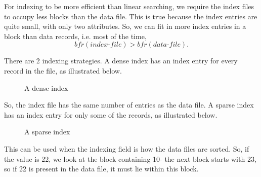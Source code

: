 \documentclass[a4paper, openany]{memoir}
\begin{document}
For indexing to be more efficient than linear searching, we require the index files to occupy less blocks than the data file. This is true because the index entries are quite small, with only two attributes. So, we can fit in more index entries in a block than data records, i.e. most of the time,
\[\textit{bfr}(\textit{index-file}) > \textit{bfr}(\textit{data-file}).\]

There are 2 indexing strategies. A dense index has an index entry for every record in the file, as illustrated below.
\begin{figure}[H]
    \centering
    \caption{A dense index}
\end{figure}
\noindent So, the index file has the same number of entries as the data file. A sparse index has an index entry for only some of the records, as illustrated below.
\begin{figure}[H]
    \centering
    \caption{A sparse index}
\end{figure}
\noindent This can be used when the indexing field is how the data files are sorted. So, if the value is 22, we look at the block containing 10- the next block starts with 23, so if 22 is present in the data file, it must lie within this block.
\end{document}
